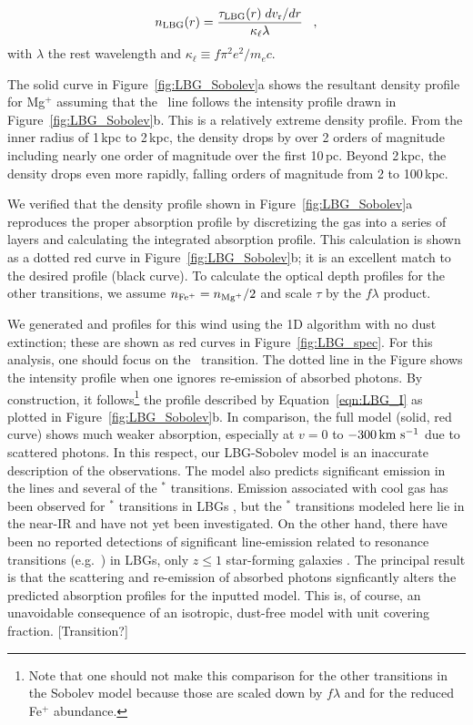 \documentclass[12pt,preprint]{aastex}
\begin{document}
\begin{equation}
n_{\rm LBG}(r) = \frac{\tau_{\rm LBG}(r) \; dv_{\rm r}/dr}{\kappa_\ell
  \lambda} \;\;\; ,
\label{eqn:Sobolev}
\end{equation}
with $\lambda$ the rest wavelength and $\kappa_\ell \equiv f\pi^2
e^2/m_e c$.  

The solid curve in Figure~\ref{fig:LBG_Sobolev}a shows the
resultant density profile for Mg$^+$ assuming that the \mgiia\ line
follows the intensity profile drawn in Figure~\ref{fig:LBG_Sobolev}b. 
This is a relatively extreme density profile.  From the inner radius
of 1\,kpc to 2\,kpc, the density drops by over 2 orders of
magnitude including nearly one order of magnitude over the first
10\,pc.  Beyond 2\,kpc, the density drops even more rapidly, falling
orders of magnitude from 2 to 100\,kpc.

We verified that the density profile shown in
Figure~\ref{fig:LBG_Sobolev}a
reproduces the proper
absorption profile by discretizing the gas into a series of layers
and calculating the integrated absorption profile.  This
calculation is shown as a dotted red curve in
Figure~\ref{fig:LBG_Sobolev}b; it is an excellent
match to the desired profile (black curve).
To calculate the optical depth profiles for the other transitions, we
assume $n_{\rm Fe^+} = n_{\rm Mg^+}/2$ and scale $\tau$ by the $f\lambda$ product.

We generated  and  profiles for this wind
using the 1D algorithm with no dust extinction; these are shown as
red curves in Figure~\ref{fig:LBG_spec}.   For this analysis, one
should focus on the \mgiia\ transition.  The dotted line in the Figure
shows the intensity profile when one ignores re-emission
of absorbed photons.  By construction, it follows\footnote{Note that
  one should not make this comparison for the other transitions in
  the Sobolev model because those are scaled down by $f\lambda$ and
  for  the reduced Fe$^+$ abundance.} the profile
described by Equation~\ref{eqn:LBG_I} as plotted in
Figure~\ref{fig:LBG_Sobolev}b.   In comparison, the full model (solid,
red curve)
shows much weaker absorption, especially at $v = 0$ to $-300 \, {\rm km~s^{-1}}$
due to scattered photons.
In this respect, our LBG-Sobolev model is an
inaccurate description of the observations. The model
also predicts significant emission in the  lines and several of
the $^*$ transitions.   Emission associated with cool gas
has been observed for $^*$
transitions in LBGs \citep{prs+02,shapley03}, but
the $^*$ transitions
modeled here lie in the near-IR and have not yet been investigated.
On the other hand, there have been no 
reported detections of significant line-emission related to resonance
transitions (e.g.\ ) in LBGs, only $z \le 1$ star-forming galaxies
\citep{wcp+09,rubin09}.  
The principal result is that the scattering and re-emission of
absorbed photons signficantly alters the predicted absorption profiles
for the inputted model.  This is, of course, an unavoidable
consequence of an isotropic, dust-free model with unit covering
fraction.
[Transition?]
\end{document}
